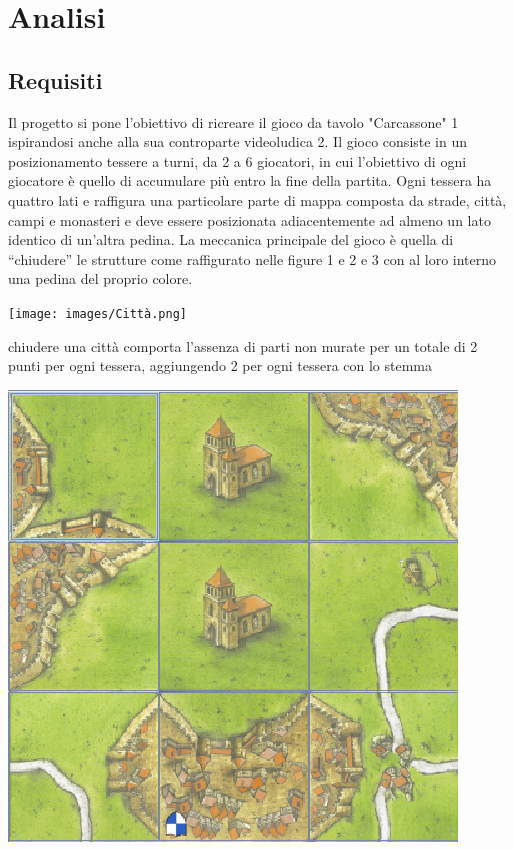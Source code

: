 \section{Analisi}
\subsection{Requisiti}

Il progetto si pone l'obiettivo di ricreare il gioco da tavolo "Carcassone" 1 ispirandosi anche alla sua controparte videoludica 2. Il gioco consiste in un posizionamento tessere a turni, da 2 a 6 giocatori, in cui l’obiettivo di ogni giocatore è quello di accumulare più entro la fine della partita. Ogni tessera ha quattro lati e raffigura una particolare parte di mappa composta da strade, città, campi e monasteri e deve essere posizionata adiacentemente ad almeno un lato identico di un'altra pedina. La meccanica principale del gioco è quella di “chiudere” le strutture come raffigurato nelle figure 1 e 2 e 3 con al loro interno una pedina del proprio colore.

\vfill

        {\texttt{[image: images/Città.png]}}

\vfill

chiudere una città comporta l’assenza di parti non murate per un totale di 2 punti per ogni tessera, aggiungendo 2 per ogni tessera con lo stemma

\vfill

        {\includegraphics[scale=.42]{images/Monastero.png}}

